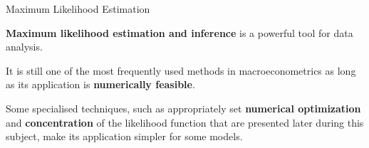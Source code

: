 \documentclass[notes,blackandwhite,mathsans]{beamer}
\begin{document}
%
%
%
%
%



{
\begin{frame}{Maximum Likelihood Estimation}

\textbf{Maximum likelihood estimation and inference} is a powerful tool for data analysis. 

\bigskip It is still one of the most frequently used methods in macroeconometrics as long as its application is \textbf{numerically feasible}.

\bigskip Some specialised techniques, such as appropriately set \textbf{numerical optimization} and \textbf{concentration} of the likelihood function that are presented later during this subject, make its application simpler for some models.

\end{frame}
}
\end{document}
